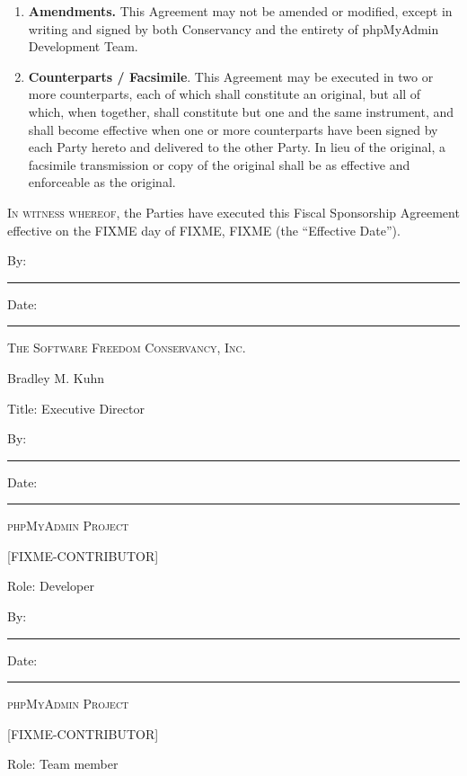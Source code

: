 \documentclass[letterpaper,12pt]{article}
\newcommand{\projectname}{phpMyAdmin Project\xspace}
\newcommand{\leadershipbody}{phpMyAdmin Development Team\xspace}
\newcommand{\signature}[3][\projectname]{
\vspace{2ex}

By: \hspace{0.95em}\rule{0.50\textwidth}{0.2mm} \hfill{}Date: \rule{0.25\textwidth}{0.2mm}

\hspace{2.5em} \textsc{#1}

\hspace{2.5em} #2

\hspace{2.5em} #3 \\[6ex]
}
\begin{document}
\begin{enumerate}[label=\arabic*.,ref=\S~\arabic*]
the laws of the State of New York. This Agreement constitutes the
only agreement, and supersedes all prior agreements and understandings,
both written and oral, among the Parties with respect to the subject
matter hereof. 
\item \textbf{Amendments. }This Agreement may not be amended or modified,
except in writing and signed by both Conservancy and the entirety of \leadershipbody. 
\item \textbf{Counterparts / Facsimile}. This Agreement may be executed
in two or more counterparts, each of which shall constitute an original,
but all of which, when together, shall constitute but one and the
same instrument, and shall become effective when one or more counterparts
have been signed by each Party hereto and delivered to the other Party.
In lieu of the original, a facsimile transmission or copy of the original
shall be as effective and enforceable as the original. 
\end{enumerate}
\vfill{}


\textsc{In witness whereof}, the Parties have executed this Fiscal
Sponsorship Agreement effective on the FIXME day of FIXME, FIXME (the
``Effective Date'').

\signature[The Software Freedom Conservancy, Inc.]{Bradley M. Kuhn}{Title: Executive Director}
\signature{[FIXME-CONTRIBUTOR]}{Role: Developer}
\signature{[FIXME-CONTRIBUTOR]}{Role: Team member}
\end{document}

